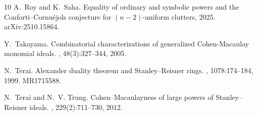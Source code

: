 \documentclass[12pt]{amsart}
\begin{document}
\begin{thebibliography}{10}
A.~Roy and K.~Saha.
\newblock Equality of ordinary and symbolic powers and the
  {Conforti--Cornu\'ejols} conjecture for $(n-2)$-uniform clutters, 2025.
\newblock arXiv:2510.15864.

Y.~Takayama.
\newblock Combinatorial characterizations of generalized {Cohen-Macaulay}
  monomial ideals.
, 48(3):327--344, 2005.

N.~Terai.
\newblock Alexander duality theorem and Stanley--Reisner rings.
, 1078:174--184, 1999.
\newblock MR1715588.


N.~Terai and N.~V. Trung.
\newblock Cohen--{Macaulayness} of large powers of {Stanley--Reisner} ideals.
, 229(2):711--730, 2012.

\end{thebibliography}
	
\end{document}
